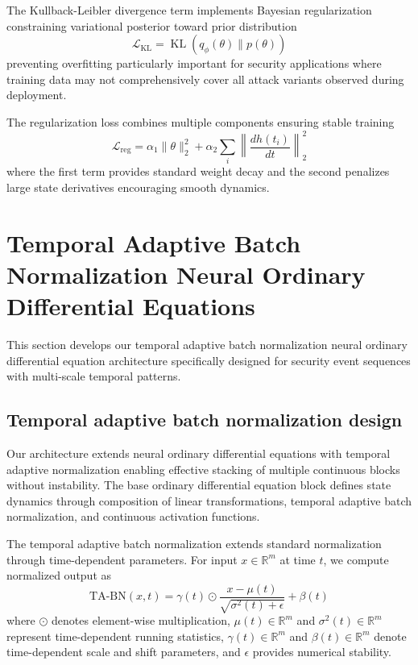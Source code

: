\documentclass[10pt,journal,compsoc]{IEEEtran}
\newcommand{\R}{\mathbb{R}}
\DeclareMathOperator{\KL}{KL}
\begin{document}
The Kullback-Leibler divergence term implements Bayesian regularization constraining variational posterior toward prior distribution
\begin{equation}
\mathcal{L}_{\text{KL}} = \KL(q_\phi(\theta) \| p(\theta))
\end{equation}
preventing overfitting particularly important for security applications where training data may not comprehensively cover all attack variants observed during deployment.

The regularization loss combines multiple components ensuring stable training
\begin{equation}
\mathcal{L}_{\text{reg}} = \alpha_1 \|\theta\|_2^2 + \alpha_2 \sum_{i} \left\|\frac{dh(t_i)}{dt}\right\|_2^2
\end{equation}
where the first term provides standard weight decay and the second penalizes large state derivatives encouraging smooth dynamics.

\section{Temporal Adaptive Batch Normalization Neural Ordinary Differential Equations}
\label{sec:architecture}

This section develops our temporal adaptive batch normalization neural ordinary differential equation architecture specifically designed for security event sequences with multi-scale temporal patterns.

\subsection{Temporal adaptive batch normalization design}

Our architecture extends neural ordinary differential equations with temporal adaptive normalization enabling effective stacking of multiple continuous blocks without instability. The base ordinary differential equation block defines state dynamics through composition of linear transformations, temporal adaptive batch normalization, and continuous activation functions.

The temporal adaptive batch normalization extends standard normalization through time-dependent parameters. For input $x \in \R^m$ at time $t$, we compute normalized output as
\begin{equation}
\text{TA-BN}(x, t) = \gamma(t) \odot \frac{x - \mu(t)}{\sqrt{\sigma^2(t) + \epsilon}} + \beta(t)
\end{equation}
where $\odot$ denotes element-wise multiplication, $\mu(t) \in \R^m$ and $\sigma^2(t) \in \R^m$ represent time-dependent running statistics, $\gamma(t) \in \R^m$ and $\beta(t) \in \R^m$ denote time-dependent scale and shift parameters, and $\epsilon$ provides numerical stability.
\end{document}
